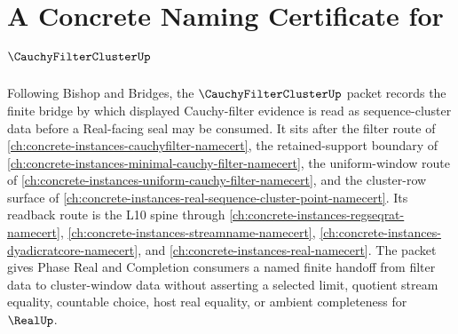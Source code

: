 \chapter{A Concrete Naming Certificate for $\CauchyFilterClusterUp$}
\label{ch:concrete-instances-cauchy-filter-cluster-namecert}

Following Bishop and Bridges, the $\CauchyFilterClusterUp$ packet records the finite bridge by which displayed Cauchy-filter evidence is read as sequence-cluster data before a Real-facing seal may be consumed. It sits after the filter route of \autoref{ch:concrete-instances-cauchyfilter-namecert}, the retained-support boundary of \autoref{ch:concrete-instances-minimal-cauchy-filter-namecert}, the uniform-window route of \autoref{ch:concrete-instances-uniform-cauchy-filter-namecert}, and the cluster-row surface of \autoref{ch:concrete-instances-real-sequence-cluster-point-namecert}. Its readback route is the L10 spine through \autoref{ch:concrete-instances-regseqrat-namecert}, \autoref{ch:concrete-instances-streamname-namecert}, \autoref{ch:concrete-instances-dyadicratcore-namecert}, and \autoref{ch:concrete-instances-real-namecert}. The packet gives Phase Real and Completion consumers a named finite handoff from filter data to cluster-window data without asserting a selected limit, quotient stream equality, countable choice, host real equality, or ambient completeness for $\RealUp$.

